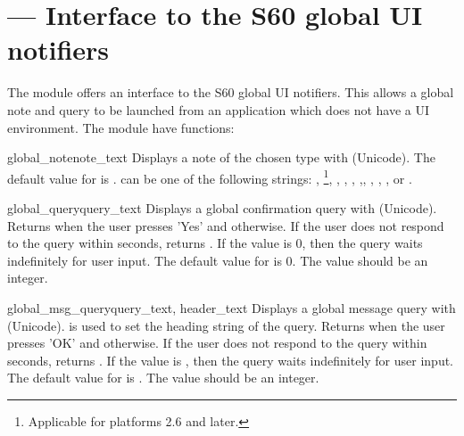 %
%
%

\section{ --- 
    Interface to the S60 global UI notifiers }
\label{sec:globalui}


The  module offers an interface to the S60 global UI notifiers. 
This allows a global note and query to be launched from an application which does not 
have a UI environment. 
The  module have functions:

\begin{funcdesc}{global_note}{note_text}
Displays a note of the chosen type with  
(Unicode). The default value for  is .  can be 
one of the following strings: , \footnote{Applicable for 
platforms 2.6 and later.}, , , , 
,, , , 
, or . 
\end{funcdesc}

\begin{funcdesc}{global_query}{query_text}
Displays a global confirmation query with  (Unicode). Returns 
 when the user presses 'Yes' and  otherwise. If the user does 
not respond to the query within  seconds, returns . 
If the  value is 0, then the query waits indefinitely for user input. 
The default value for  is 0. The  value should be an integer.
\end{funcdesc}

\begin{funcdesc}{global_msg_query}{query_text, header_text}
Displays a global message query with (Unicode).  is used 
to set the heading string of the query. Returns  when the user 
presses 'OK' and  otherwise. If the user does not respond to the query within 
 seconds, returns . If the  value is , then the query 
waits indefinitely for user input. The default value for  is . 
The  value should be an integer.
\end{funcdesc}

